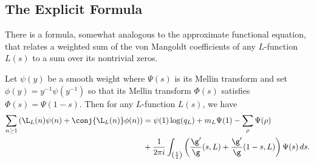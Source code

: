 \documentclass[12pt]{article}
\begin{document}
    \subsection{The Explicit Formula}
      There is a formula, somewhat analogous to the approximate functional equation, that relates a weighted sum of the von Mangoldt coefficients of any \(L\)-function \(L(s)\) to a sum over its nontrivial zeros.

      \begin{theorem*}
        Let \(\psi(y)\) be a smooth weight where \(\Psi(s)\) is its Mellin transform and set \(\phi(y) = y^{-1}\psi(y^{-1})\) so that its Mellin transform \(\Phi(s)\) satisfies \(\Phi(s) = \Psi(1-s)\). Then for any \(L\)-function \(L(s)\), we have
        \begin{align*}
          \sum_{n \ge 1}\left(\L_{L}(n)\psi(n)+\conj{\L_{L}(n)}\phi(n)\right) &= \psi(1)\log(q_{L})+m_{L}\Psi(1)-\sum_{\rho}\Psi(\rho) \\
          &+ \frac{1}{2\pi i}\int_{\left(\frac{1}{2}\right)}\left(\frac{\g'}{\g}(s,L)+\frac{\g'}{\g}(1-s,L)\right)\Psi(s)\,ds.
        \end{align*}
      \end{theorem*}
\end{document}
